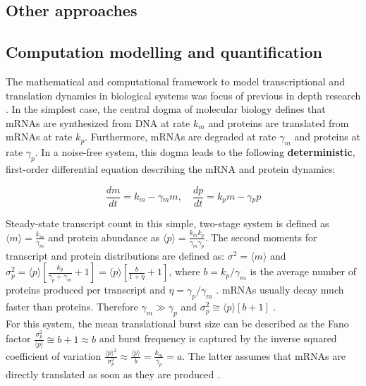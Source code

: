 \subsection{Other approaches}

\subsection{Computation modelling and quantification}

The mathematical and computational framework to model transcriptional and translation dynamics in biological systems was focus of previous in depth research \citep{Tsimring2014}. In the simplest case, the central dogma of molecular biology defines that mRNAs are synthesized from DNA at rate $k_m$ and proteins are translated from mRNAs at rate $k_p$. Furthermore, mRNAs are degraded at rate $\gamma_m$ and proteins at rate $\gamma_p$. In a noise-free system, this dogma leads to the following \textbf{deterministic}, first-order differential equation describing the mRNA and protein dynamics:

\begin{equation}
\frac{dm}{dt}=k_m-\gamma{}_mm,\quad \frac{dp}{dt}=k_pm-\gamma{}_pp
\end{equation}

\doublespacing
\noindent Steady-state transcript count in this simple, two-stage system is defined as $\langle{}m\rangle{}=\frac{k_m}{\gamma_m}$  and protein abundance as $\langle{}p\rangle{}=\frac{k_mk_p}{\gamma_m\gamma_p }$. The second moments for transcript and protein distributions are defined as: $\sigma^2=\langle{}m\rangle{}$ and $\sigma_p^2=\langle{}p\rangle{}\left[\frac{k_p}{\gamma_p+\gamma_m}+1\right]=\langle{}p\rangle{}\left[\frac{b}{1+\eta}+1\right]$, where $b=k_p/\gamma_m$  is the average number of proteins produced per transcript and $\eta=\gamma_p/\gamma_m$  \citep{Tsimring2014, Thattai2001}. mRNAs usually decay much faster than proteins. Therefore $\gamma_m\gg{}\gamma_p$ and $\sigma_p^2\cong\langle{}p\rangle{}\left[b+1\right]$ \citep{Thattai2001}.\\
For this system, the mean translational burst size can be described as the Fano factor $\frac{\sigma_p^2}{\langle{}p\rangle}\cong{}b+1\approx{}b$ and burst frequency is captured by the inverse squared coefficient of variation $\frac{\langle{}p\rangle{}^2}{\sigma_p^2}\approx{}\frac{\langle{}p\rangle{}}{b}=\frac{k_m}{\gamma_p}=a$. The latter assumes that mRNAs are directly translated as soon as they are produced \citep{Friedman2006}.\\

